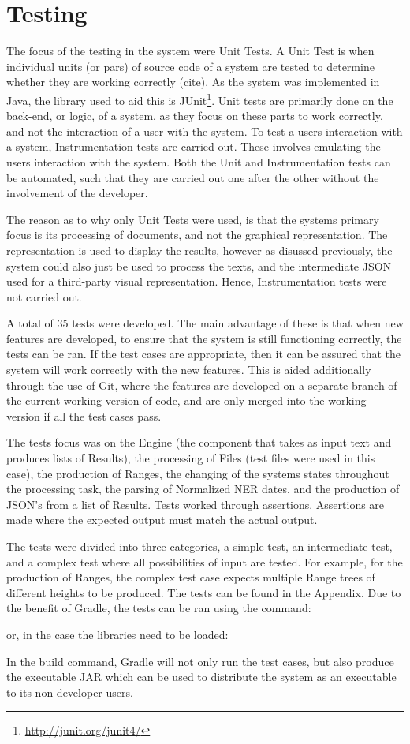 \section{Testing}
\par The focus of the testing in the system were Unit Tests. A Unit Test is when individual units (or pars) of source code of a system are tested to determine whether they are working correctly (cite). As the system was implemented in Java, the library used to aid this is JUnit\footnote{\url{http://junit.org/junit4/}}. Unit tests are primarily done on the back-end, or logic, of a system, as they focus on these parts to work correctly, and not the interaction of a user with the system. To test a users interaction with a system, Instrumentation tests are carried out. These involves emulating the users interaction with the system. Both the Unit and Instrumentation tests can be automated, such that they are carried out one after the other without the involvement of the developer.
\par The reason as to why only Unit Tests were used, is that the systems primary focus is its processing of documents, and not the graphical representation. The representation is used to display the results, however as disussed previously, the system could also just be used to process the texts, and the intermediate JSON used for a third-party visual representation. Hence, Instrumentation tests were not carried out.
\par A total of 35 tests were developed. The main advantage of these is that when new features are developed, to ensure that the system is still functioning correctly, the tests can be ran. If the test cases are appropriate, then it can be assured that the system will work correctly with the new features. This is aided additionally through the use of Git, where the features are developed on a separate branch of the current working version of code, and are only merged into the working version if all the test cases pass.
\par The tests focus was on the Engine (the component that takes as input text and produces lists of Results), the processing of Files (test files were used in this case), the production of Ranges, the changing of the systems states throughout the processing task, the parsing of Normalized NER dates, and the production of JSON's from a list of Results. Tests worked through assertions. Assertions are made where the expected output must match the actual output.
\par The tests were divided into three categories, a simple test, an intermediate test, and a complex test where all possibilities of input are tested. For example, for the production of Ranges, the complex test case expects multiple Range trees of different heights to be produced. The tests can be found in the Appendix. Due to the benefit of Gradle, the tests can be ran using the command:\par
{}
or, in the case the libraries need to be loaded:\par
{}
In the build command, Gradle will not only run the test cases, but also produce the executable JAR which can be used to distribute the system as an executable to its non-developer users.
